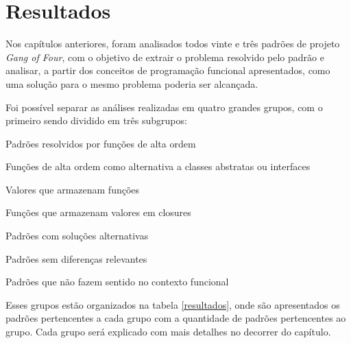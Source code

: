 \chapter{Resultados}

Nos capítulos anteriores, foram analisados todos 
vinte e três padrões de projeto \textit{Gang of 
Four}, com o objetivo de extrair o problema 
resolvido pelo padrão e analisar, a partir dos 
conceitos de programação funcional apresentados, 
como uma solução para o mesmo problema poderia ser 
alcançada. 

Foi possível separar as análises realizadas em 
quatro grandes grupos, com o primeiro sendo 
dividido em três subgrupos: 

\begin{alineas}
    \item Padrões resolvidos por funções de alta ordem
    \begin{alineas}
        \item Funções de alta ordem como alternativa a classes abstratas ou interfaces
        \item Valores que armazenam funções
        \item Funções que armazenam valores em closures
    \end{alineas}
    \item Padrões com soluções alternativas
    \item Padrões sem diferenças relevantes
    \item Padrões que não fazem sentido no contexto funcional
\end{alineas}

Esses grupos estão organizados na tabela 
\ref{resultados}, onde são apresentados os 
padrões pertencentes a cada grupo com a 
quantidade de padrões pertencentes ao grupo. 
Cada grupo será explicado com mais detalhes 
no decorrer do capítulo.

